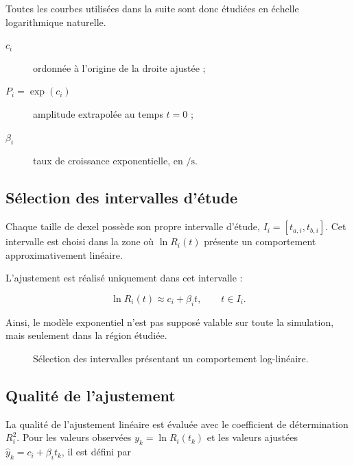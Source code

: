 \documentclass[
    11pt,
    a4paper
]{article}
\begin{document}
Toutes les courbes utilisées dans la suite sont donc étudiées en échelle
logarithmique naturelle.

\begin{description}
    \item[\(c_i\)] ordonnée à l'origine de la droite ajustée ;
    \item[\(P_i=\exp(c_i)\)] amplitude extrapolée au temps \(t=0\) ;
    \item[\(\beta_i\)] taux de croissance exponentielle, en
    \(\si{\per\second}\).
\end{description}

\subsection{Sélection des intervalles d'étude}
\label{subsec:intervalles-etude}

Chaque taille de dexel possède son propre intervalle d'étude,
\(I_i=[t_{a,i},t_{b,i}]\). Cet intervalle est choisi dans la zone où
\(\ln R_i(t)\) présente un comportement approximativement linéaire.

L'ajustement est réalisé uniquement dans cet intervalle :

\begin{equation}
    \ln R_i(t)
    \approx
    c_i+\beta_i t,
    \qquad
    t\in I_i.
    \label{eq:fit-intervalle}
\end{equation}

Ainsi, le modèle exponentiel n'est pas supposé valable sur toute la simulation,
mais seulement dans la région étudiée.

\begin{figure}[H]
    \centering
    \caption{Sélection des intervalles présentant un comportement log-linéaire.}
    \label{fig:intervalles-log}
\end{figure}

\subsection{Qualité de l'ajustement}
\label{subsec:qualite-ajustement}

La qualité de l'ajustement linéaire est évaluée avec le coefficient de
détermination \(R_i^2\). Pour les valeurs observées
\(y_k=\ln R_i(t_k)\) et les valeurs ajustées
\(\widehat{y}_k=c_i+\beta_i t_k\), il est défini par
\end{document}
